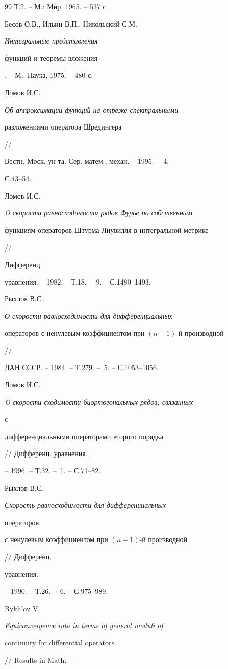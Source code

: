 {\begin{thebibliography}{99}
Т.2. -- М.: Мир, 1965. -- 537 с.




Бесов О.В., Ильин В.П., Никольский С.М. {\em Интегральные представления


функций и теоремы вложения}. -- М.: Наука, 1975. -- 480 с.




Ломов И.С. {\em Об аппроксимации функций на отрезке спектральными


разложениями оператора Шредингера} //


Вестн. Моск. ун-та. Сер. матем., механ. -- 1995. -- \No\,4. --


С.43--54.




Ломов И.С. {\em O скорости равносходимости рядов Фурье по собственным


функциям операторов Штурма-Лиувилля в интегральной метрике} //


Дифференц.


уравнения. -- 1982. -- Т.18. -- \No\,9. -- С.1480--1493.




Рыхлов В.С. {\em О скорости равносходимости для дифференциальных


операторов с ненулевым коэффициентом при $(n-1)$-й производной} //


ДАН СССР. -- 1984. -- Т.279. -- \No\,5. -- С.1053--1056.




Ломов И.С. {\em O скорости сходимости биортогональных рядов, связанных


с


дифференциальными операторами второго порядка} // Дифференц. уравнения.


-- 1996. -- Т.32. -- \No\,1. -- С.71--82.




Рыхлов В.С. {\em Скорость равносходимости для дифференциальных


операторов


с ненулевым коэффициентом при $(n-1)$-й производной} // Дифференц.


уравнения.


-- 1990. -- Т.26. -- \No\,6. -- С.975--989.




Rykhlov V. {\em Equiconvergence rate in terms of general moduli of


continuity for differential operators} // Results in Math. --



\end{thebibliography}}
